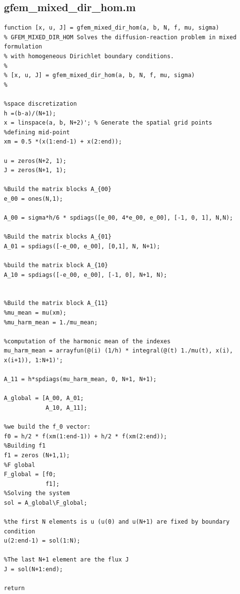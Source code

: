 \documentclass{article}
\begin{document}
\subsection{gfem\_mixed\_dir\_hom.m}
\label{code:mix_gfem}
\begin{lstlisting}[style=matlab-editor]
    function [x, u, J] = gfem_mixed_dir_hom(a, b, N, f, mu, sigma)
% GFEM_MIXED_DIR_HOM Solves the diffusion-reaction problem in mixed formulation
% with homogeneous Dirichlet boundary conditions.
%
% [x, u, J] = gfem_mixed_dir_hom(a, b, N, f, mu, sigma)
%

%space discretization
h =(b-a)/(N+1);
x = linspace(a, b, N+2)'; % Generate the spatial grid points
%defining mid-point 
xm = 0.5 *(x(1:end-1) + x(2:end));

u = zeros(N+2, 1); 
J = zeros(N+1, 1); 

%Build the matrix blocks A_{00} 
e_00 = ones(N,1);

A_00 = sigma*h/6 * spdiags([e_00, 4*e_00, e_00], [-1, 0, 1], N,N);

%Build the matrix blocks A_{01}
A_01 = spdiags([-e_00, e_00], [0,1], N, N+1);

%build the matrix block A_{10}
A_10 = spdiags([-e_00, e_00], [-1, 0], N+1, N);


%Build the matrix block A_{11}
%mu_mean = mu(xm);
%mu_harm_mean = 1./mu_mean; 

%computation of the harmonic mean of the indexes 
mu_harm_mean = arrayfun(@(i) (1/h) * integral(@(t) 1./mu(t), x(i), x(i+1)), 1:N+1)';

A_11 = h*spdiags(mu_harm_mean, 0, N+1, N+1);

A_global = [A_00, A_01;
            A_10, A_11];

%we build the f_0 vector:
f0 = h/2 * f(xm(1:end-1)) + h/2 * f(xm(2:end));
%Building f1
f1 = zeros (N+1,1);
%F global
F_global = [f0;
            f1];
%Solving the system
sol = A_global\F_global;

%the first N elements is u (u(0) and u(N+1) are fixed by boundary condition
u(2:end-1) = sol(1:N);

%The last N+1 element are the flux J
J = sol(N+1:end);

return
\end{lstlisting}
\end{document}
